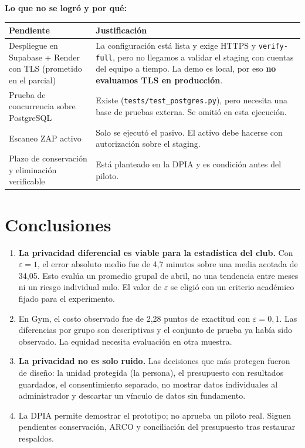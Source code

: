 \documentclass[11pt]{article}
\begin{document}
\textbf{Lo que no se logró y por qué:}
\begin{table}[H]
\centering\small
\begin{tabularx}{\textwidth}{@{}p{5cm}Y@{}}
\toprule
\textbf{Pendiente} & \textbf{Justificación} \\
\midrule
Despliegue en Supabase + Render con TLS (prometido en el parcial) & La configuración está lista y exige HTTPS y \texttt{verify-full}, pero no llegamos a validar el staging con cuentas del equipo a tiempo. La demo es local, por eso \textbf{no evaluamos TLS en producción}. \\
Prueba de concurrencia sobre PostgreSQL & Existe (\texttt{tests/test\_postgres.py}), pero necesita una base de pruebas externa. Se omitió en esta ejecución. \\
Escaneo ZAP activo & Solo se ejecutó el pasivo. El activo debe hacerse con autorización sobre el staging. \\
Plazo de conservación y eliminación verificable & Está planteado en la DPIA y es condición antes del piloto. \\
\bottomrule
\end{tabularx}
\end{table}

\section{Conclusiones}
\begin{enumerate}[nosep]
  \item \textbf{La privacidad diferencial es viable para la estadística del club.} Con $\varepsilon = 1$, el error absoluto medio fue de 4,7 minutos sobre una media acotada de 34,05. Esto evalúa un promedio grupal de abril, no una tendencia entre meses ni un riesgo individual nulo. El valor de $\varepsilon$ se eligió con un criterio académico fijado para el experimento.
  \item En Gym, el costo observado fue de 2,28 puntos de exactitud con $\varepsilon=0{,}1$. Las diferencias por grupo son descriptivas y el conjunto de prueba ya había sido observado. La equidad necesita evaluación en otra muestra.
  \item \textbf{La privacidad no es solo ruido.} Las decisiones que más protegen fueron de diseño: la unidad protegida (la persona), el presupuesto con resultados guardados, el consentimiento separado, no mostrar datos individuales al administrador y descartar un vínculo de datos sin fundamento.
  \item La DPIA permite demostrar el prototipo; no aprueba un piloto real. Siguen pendientes conservación, ARCO y conciliación del presupuesto tras restaurar respaldos.
\end{enumerate}
\end{document}
